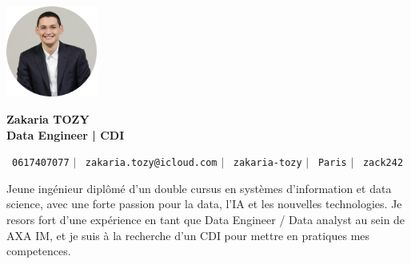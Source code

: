 \documentclass[11pt,a4paper]{article}
\begin{document}
\begin{flushleft}
  \begin{minipage}[c]{0.2\textwidth}
    \includegraphics[width=3cm]{images/profilpicture.png}
  \end{minipage}%
  \begin{minipage}[c]{0.8\textwidth}
    {\Huge \textbf{Zakaria TOZY}} \\[2pt]
    {\Large \textbf{Data Engineer | CDI}}
  \end{minipage}
\end{flushleft}

\vspace{-25pt}

\begin{center}
    \small \faPhone\ \texttt{0617407077} \hspace{1pt} $|$
    \hspace{1pt} \faEnvelope\ \texttt{zakaria.tozy@icloud.com} \hspace{1pt} $|$
    \hspace{1pt} \faLinkedin\ \texttt{zakaria-tozy} \hspace{1pt} $|$
    \hspace{1pt} \faMapMarker\ \texttt{Paris} \hspace{1pt} $|$
    \hspace{1pt} \faGithub\ \texttt{zack242} \\ \vspace{0pt}
\end{center}

\begin{itemize}[leftmargin=0in, label={}]
\footnotesize{\item{
Jeune ingénieur diplômé d'un double cursus en systèmes d'information et data science, avec une forte passion pour la data, l'IA et les nouvelles technologies. Je resors fort d'une expérience en tant que Data Engineer / Data analyst au sein de AXA IM, et je suis à la recherche d'un CDI pour mettre en pratiques mes competences.
}}
\end{itemize}
\end{document}
